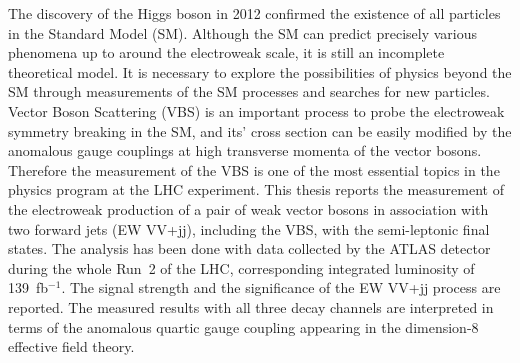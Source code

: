 The discovery of the Higgs boson in 2012 confirmed the existence of all particles in the Standard Model (SM). 
Although the SM can predict precisely various phenomena up to around the electroweak scale, it is still an incomplete theoretical model. 
It is necessary to explore the possibilities of physics beyond the SM through measurements of the SM processes and searches for new particles. 
Vector Boson Scattering (VBS) is an important process to probe the electroweak symmetry breaking in the SM, and its’ cross section can be easily modified by the anomalous gauge couplings at high transverse momenta of the vector bosons. 
Therefore the measurement of the VBS is one of the most essential topics in the physics program at the LHC experiment.
This thesis reports the measurement of the electroweak production of a pair of weak vector bosons in association with two forward jets (EW VV+jj), including the VBS, with the semi-leptonic final states.
The analysis has been done with data collected by the ATLAS detector during the whole Run~2 of the LHC, corresponding integrated luminosity of 139~fb$^{-1}$.
The signal strength and the significance of the EW VV+jj process are reported.
The measured results with all three decay channels are interpreted in terms of the anomalous quartic gauge coupling appearing in the dimension-8 effective field theory.

